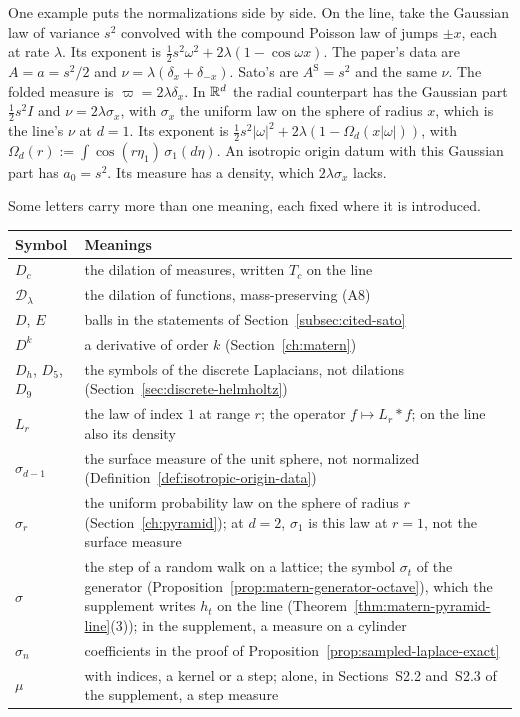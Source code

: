 One example puts the normalizations side by side. On the line, take the Gaussian law of variance
$s^2$ convolved with the compound Poisson law of jumps $\pm x$, each at rate $\lambda$. Its exponent
is $\tfrac12 s^2\omega^2 + 2\lambda(1 - \cos\omega x)$. The paper's data are $A = a = s^2/2$ and
$\nu = \lambda(\delta_x + \delta_{-x})$. Sato's are $A^{\mathrm S} = s^2$ and the same $\nu$. The
folded \Levy{} measure is $\varpi = 2\lambda\delta_x$. In $\mathbb{R}^d$ the radial counterpart has the
Gaussian part $\tfrac12 s^2 I$ and $\nu = 2\lambda\sigma_x$, with $\sigma_x$ the uniform law on the
sphere of radius $x$, which is the line's $\nu$ at $d = 1$. Its exponent is
$\tfrac12 s^2|\omega|^2 + 2\lambda(1 - \Omega_d(x|\omega|))$, with
$\Omega_d(r) := \int\cos(r\eta_1)\,\sigma_1(d\eta)$. An isotropic origin datum with this Gaussian part
has $a_0 = s^2$. Its \Levy{} measure has a density, which $2\lambda\sigma_x$ lacks.

Some letters carry more than one meaning, each fixed where it is introduced.

\begin{center}
\small
\begin{tabular}{>{\raggedright\arraybackslash}p{}>{\raggedright\arraybackslash}p{}}
\toprule
Symbol & Meanings \\
\midrule
$D_c$ & the dilation of measures, written $T_c$ on the line \\
$\mathcal{D}_\lambda$ & the dilation of functions, mass-preserving (A8) \\
$D$, $E$ & balls in the statements of Section~\ref{subsec:cited-sato} \\
$D^k$ & a derivative of order $k$ (Section~\ref{ch:matern}) \\
$D_h$, $D_5$, $D_9$ & the symbols of the discrete Laplacians, not dilations
(Section~\ref{sec:discrete-helmholtz}) \\
$L_r$ & the \Matern{} law of index $1$ at range $r$; the operator $f \mapsto L_r * f$; on the line
also its density \\
$\sigma_{d-1}$ & the surface measure of the unit sphere, not normalized (Definition~\ref{def:isotropic-origin-data}) \\
$\sigma_r$ & the uniform probability law on the sphere of radius $r$ (Section~\ref{ch:pyramid});
at $d = 2$, $\sigma_1$ is this law at $r = 1$, not the surface measure \\
$\sigma$ & the step of a random walk on a lattice; the symbol $\sigma_t$ of the generator
(Proposition~\ref{prop:matern-generator-octave}), which the supplement writes $h_t$ on the line
(Theorem~\ref{thm:matern-pyramid-line}(3)); in the supplement, a measure on a cylinder \\
$\sigma_n$ & coefficients in the proof of Proposition~\ref{prop:sampled-laplace-exact} \\
$\mu$ & with indices, a kernel or a step; alone, in Sections~S2.2 and~S2.3 of the supplement, a
step measure \\
\bottomrule
\end{tabular}
\end{center}

